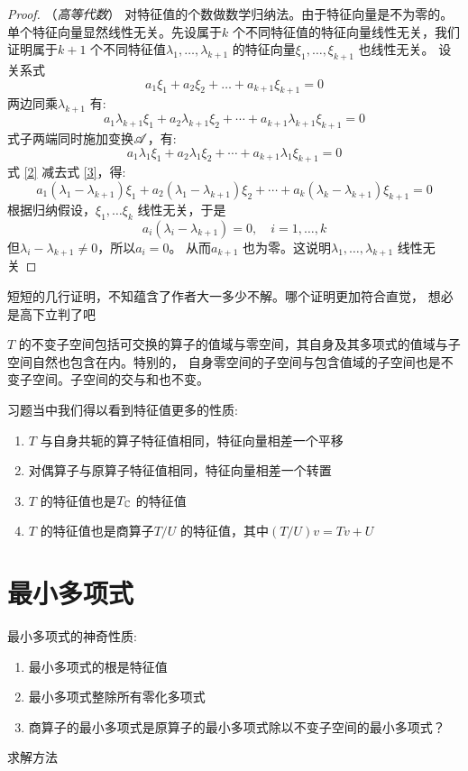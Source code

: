 \begin{proof}
    （\textit{高等代数}）
    对特征值的个数做数学归纳法。由于特征向量是不为零的。单个特征向量显然线性无关。先设属于\(k\)
    个不同特征值的特征向量线性无关，我们证明属于\(k+1\) 个不同特征值\(\lambda_1,\dots
    ,\lambda_{k+1}\) 的特征向量\(\xi_1,\dots, \xi_{k+1}\) 也线性无关。
    设关系式
    \begin{equation}
        a_1\xi_1 + a_2\xi_2 + \dots + a_{k+1}\xi_{k+1} = 0 \label{1}
    \end{equation}
    两边同乘\(\lambda_{k+1}\) 有:
    \begin{equation}
        a_1\lambda_{k+1}\xi_1 + a_2\lambda_{k+1}\xi_2 +
        \cdots + a_{k+1}\lambda_{k+1}\xi_{k+1} = 0 \label{2}
    \end{equation}
    式子两端同时施加变换\(\mathscr{A}\)，有:
    \begin{equation}
        a_1\lambda_1\xi_1 + a_2\lambda_1\xi_2 + \cdots +
        a_{k+1}\lambda_1\xi_{k+1} = 0 \label{3}
    \end{equation}
    式 \eqref{2} 减去式 \eqref{3}，得:
    \[
        a_1(\lambda_1 - \lambda_{k+1})\xi_1 + a_2(\lambda_1
        - \lambda_{k+1})\xi_2 + \cdots +
        a_{k}(\lambda_{k} - \lambda_{k+1})\xi_{k+1} = 0
    \]
    根据归纳假设，\(\xi_1,\dots \xi_{k}\) 线性无关，于是
    \[
        a_{i}(\lambda_{i} - \lambda_{k+1}) = 0, \quad i=1,\dots ,k
    \]
    但\(\lambda_{i}-\lambda_{k+1}\neq 0\)，所以\(a_{i}=0\)。
    从而\(a_{k+1}\) 也为零。这说明\(\lambda_1,\dots ,\lambda_{k+1}\) 线性无关
\end{proof}

短短的几行证明，不知蕴含了作者大一多少不解。哪个证明更加符合直觉，
想必是高下立判了吧

\(T\) 的不变子空间包括可交换的算子的值域与零空间，其自身及其多项式的值域与子空间自然也包含在内。特别的，
自身零空间的子空间与包含值域的子空间也是不变子空间。子空间的交与和也不变。

习题当中我们得以看到特征值更多的性质:
\begin{enumerate}
    \item \(T\) 与自身共轭的算子特征值相同，特征向量相差一个平移
    \item 对偶算子与原算子特征值相同，特征向量相差一个转置
    \item \(T\) 的特征值也是\(T_{\mathbb{C}}\) 的特征值
    \item \(T\) 的特征值也是商算子\(T/U\) 的特征值，其中\((T/U)v=Tv+U\)
\end{enumerate}

\section{最小多项式}


最小多项式的神奇性质:
\begin{enumerate}
    \item 最小多项式的根是特征值
    \item 最小多项式整除所有零化多项式
    \item 商算子的最小多项式是原算子的最小多项式除以不变子空间的最小多项式？
\end{enumerate}
求解方法

